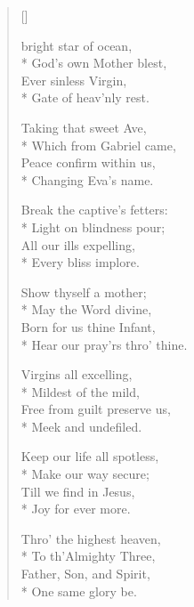  \newHymn



\settowidth{\versewidth}{Of the Lord most high.}
\begin{multicols}{2}
\begin{verse}[\versewidth]

	 bright star of ocean,\\*
 God's own Mother blest,\\
Ever sinless Virgin,\\*
 Gate of heav'nly rest.
\pointorig

Taking that sweet Ave,\\*
    Which from Gabriel came,\\
        Peace confirm within us,\\*
    Changing Eva's name.
    
Break the captive's fetters:\\*
    Light on blindness pour;\\
        All our ills expelling,\\*
    Every bliss implore.
    
Show thyself a mother;\\*
    May the Word divine,\\
        Born for us thine Infant,\\*
    Hear our pray'rs thro' thine.
    
Virgins all excelling,\\*
    Mildest of the mild,\\
        Free from guilt preserve us,\\*
    Meek and undefiled.
    
Keep our life all spotless,\\*
    Make our way secure;\\
        Till we find in Jesus,\\*
    Joy for ever more.
    
Thro' the highest heaven,\\*
    To th'Almighty Three,\\
        Father, Son, and Spirit,\\*
    One same glory be.

\end{verse}
\end{multicols}



